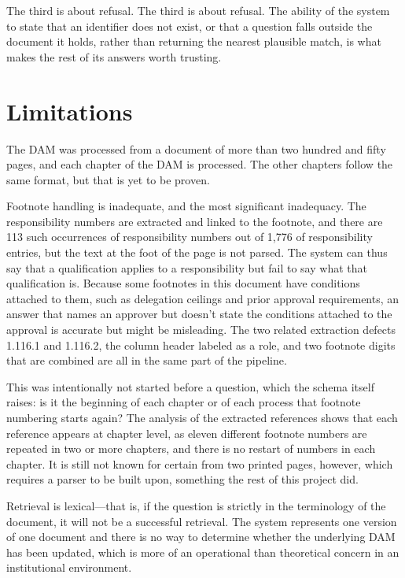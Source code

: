 The third is about refusal. The third is about refusal. The ability of the system to state that an identifier does not exist, or that a question falls outside the document it holds, rather than returning the nearest plausible match, is what makes the rest of its answers worth trusting.

\section*{Limitations}

The DAM was processed from a document of more than two hundred and fifty pages, and each chapter of the DAM is processed. The other chapters follow the same format, but that is yet to be proven.

Footnote handling is inadequate, and the most significant inadequacy. The responsibility numbers are extracted and linked to the footnote, and there are 113 such occurrences of responsibility numbers out of 1,776 of responsibility entries, but the text at the foot of the page is not parsed. The system can thus say that a qualification applies to a responsibility but fail to say what that qualification is. Because some footnotes in this document have conditions attached to them, such as delegation ceilings and prior approval requirements, an answer that names an approver but doesn't state the conditions attached to the approval is accurate but might be misleading. The two related extraction defects 1.116.1 and 1.116.2, the column header labeled as a role, and two footnote digits that are combined are all in the same part of the pipeline.

This was intentionally not started before a question, which the schema itself raises: is it the beginning of each chapter or of each process that footnote numbering starts again? The analysis of the extracted references shows that each reference appears at chapter level, as eleven different footnote numbers are repeated in two or more chapters, and there is no restart of numbers in each chapter. It is still not known for certain from two printed pages, however, which requires a parser to be built upon, something the rest of this project did.

Retrieval is lexical—that is, if the question is strictly in the terminology of the document, it will not be a successful retrieval. The system represents one version of one document and there is no way to determine whether the underlying DAM has been updated, which is more of an operational than theoretical concern in an institutional environment.

